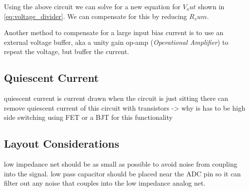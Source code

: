 \documentclass[main.tex]{subfiles}
\begin{document}

\begin{equation}
    \label{eq:loaded_voltage_divider}
\end{equation} 

Using the above circuit we can solve for a new equation for $V_out$ shown in \eqref{eq:voltage_divider}. We can compensate for this by reducing $R_sum$. 

Another method to compensate for a large input bias current is to use an external voltage buffer, aka a unity gain op-amp (\textit{Operational Amplifier}) to repeat the voltage, but buffer the current. 



\subsection{Quiescent Current}
quiescent current is current drawn when the circuit is just sitting there
can remove quiescent current of this circuit with transistors -> why is has to be high side switching
using FET or a BJT for this functionality

\subsection{Layout Considerations}
low impedance net should be as small as possible to avoid noise from coupling into the signal. 
low pass capacitor should be placed near the ADC pin so it can filter out any noise that couples into the low impedance analog net. 
\end{document}
